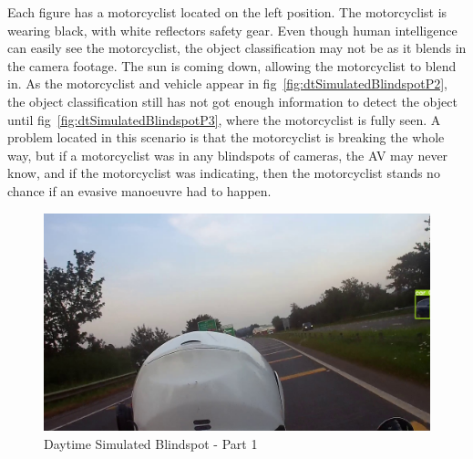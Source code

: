 \documentclass[12pt]{report} %
\begin{document}
		Each figure has a motorcyclist located on the left position. The motorcyclist is wearing black, with white reflectors safety gear. Even though human intelligence can easily see the motorcyclist, the object classification may not be as it blends in the camera footage. The sun is coming down, allowing the motorcyclist to blend in. As the motorcyclist and vehicle appear in fig~\ref{fig:dtSimulatedBlindspotP2}, the object classification still has not got enough information to detect the object until fig~\ref{fig:dtSimulatedBlindspotP3}, where the motorcyclist is fully seen. A problem located in this scenario is that the motorcyclist is breaking the whole way, but if a motorcyclist was in any blindspots of cameras, the AV may never know, and if the motorcyclist was indicating, then the motorcyclist stands no chance if an evasive manoeuvre had to happen.
		\begin{figure}[ht]
			\centering
			\includegraphics[width=.74\columnwidth]{Figures/scenarios/blindspot_day_t1/Misc_T4-334.jpg}
			\caption{Daytime Simulated Blindspot - Part 1}
			\label{fig:dtSimulatedBlindspotP1}
		\end{figure}
\end{document}
